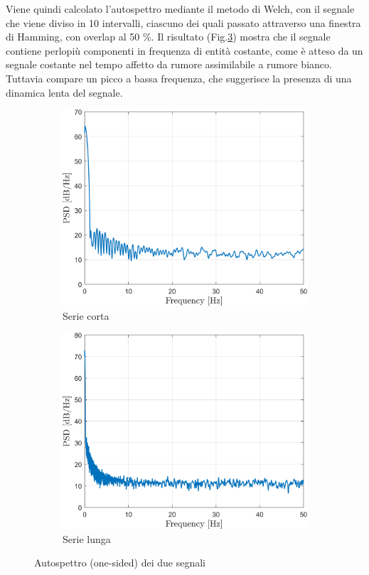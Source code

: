 Viene quindi calcolato l'autospettro mediante il metodo di Welch, con il segnale che viene diviso in 10 intervalli, ciascuno dei quali passato attraverso una finestra di Hamming, con overlap al 50 \%. Il risultato (Fig.\ref{fig:freqboth}) mostra che il segnale contiene perlopiù componenti in frequenza di entità costante, come è atteso da un segnale costante nel tempo affetto da rumore assimilabile a rumore bianco. Tuttavia compare un picco a bassa frequenza, che suggerisce la presenza di una dinamica lenta del segnale. 


\begin{figure}
	\centering
	\begin{subfigure}{0.5\textwidth}
		\centering
	\includegraphics[width=0.95\linewidth]{"../sperimentazione nei propulsori/freq_short"}
	\caption{Serie corta}
	\label{fig:freqshort}
	\end{subfigure}%
	\begin{subfigure}{0.5\textwidth}
	\centering
\includegraphics[width=0.95\linewidth]{"../sperimentazione nei propulsori/freq_long"}
\caption{Serie lunga}
\label{fig:freqlong}
	\end{subfigure}
	\caption{Autospettro (one-sided) dei due segnali}
	\label{fig:freqboth}
\end{figure}
